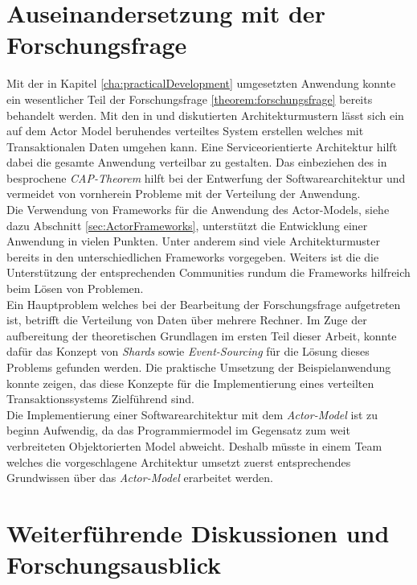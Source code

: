 \section{Auseinandersetzung mit der Forschungsfrage}
Mit der in Kapitel \ref{cha:practicalDevelopment} umgesetzten Anwendung konnte ein wesentlicher Teil der Forschungsfrage \ref{theorem:forschungsfrage} bereits behandelt werden. Mit den in \cite{Vernon2015ReactiveAkka} und \cite{akkaInAction} diskutierten Architekturmustern lässt sich ein auf dem Actor Model beruhendes verteiltes System erstellen welches mit Transaktionalen Daten umgehen kann. Eine Serviceorientierte Architektur hilft dabei die gesamte Anwendung verteilbar zu gestalten. 
Das einbeziehen des in \cite{gilbertPerspectiveCAPTheorem2012} besprochene \textit{CAP-Theorem} hilft bei der Entwerfung der Softwarearchitektur und vermeidet von vornherein Probleme mit der Verteilung der Anwendung. \\
Die Verwendung von Frameworks für die Anwendung des Actor-Models, siehe dazu Abschnitt \ref{sec:ActorFrameworks}, unterstützt die Entwicklung einer Anwendung in vielen Punkten. Unter anderem sind viele Architekturmuster bereits in den unterschiedlichen Frameworks vorgegeben. Weiters ist die die Unterstützung der entsprechenden Communities rundum die Frameworks hilfreich beim Lösen von Problemen. \\
Ein Hauptproblem welches bei der Bearbeitung der Forschungsfrage aufgetreten ist, betrifft die Verteilung von Daten über mehrere Rechner. Im Zuge der aufbereitung der theoretischen Grundlagen im ersten Teil dieser Arbeit, konnte dafür das Konzept von \textit{Shards} sowie \textit{Event-Sourcing} für die Lösung dieses Problems gefunden werden. Die praktische Umsetzung der Beispielanwendung konnte zeigen, das diese Konzepte für die Implementierung eines verteilten Transaktionssystems Zielführend sind. \\
Die Implementierung einer Softwarearchitektur mit dem \textit{Actor-Model} ist zu beginn Aufwendig, da das Programmiermodel im Gegensatz zum weit verbreiteten Objektorierten Model abweicht. Deshalb müsste in einem Team welches die vorgeschlagene Architektur umsetzt zuerst entsprechendes Grundwissen über das \textit{Actor-Model} erarbeitet werden. \\


\section{Weiterführende Diskussionen und Forschungsausblick}

